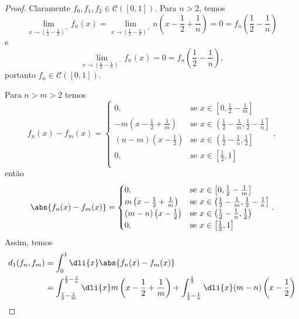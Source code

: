 \begin{proof}
    Claramente \(f_0, f_1, f_2 \in \mathcal{C}([0,1])\). Para \(n > 2\), temos
    \begin{equation*}
        \lim_{x\to \left(\frac12-\frac1n\right)^+} f_n(x) = \lim_{x\to\left(\frac12-\frac1n\right)^+} n\left(x-\frac12+\frac1n\right) = 0 = f_n\left(\frac12-\frac1n\right)
    \end{equation*}
    e
    \begin{equation*}
        \lim_{x\to \left(\frac12-\frac1n\right)^-} f_n(x) = 0 = f_n\left(\frac12-\frac1n\right),
    \end{equation*}
    portanto \(f_n \in \mathcal{C}([0,1])\).

    Para \(n > m > 2\) temos
    \begin{equation*}
        f_n(x) - f_m(x) = \begin{cases}
            0, &\text{se }x \in \left[0, \frac12-\frac1m\right]\\
            -m\left(x - \frac12 + \frac1m\right)&\text{se }x \in \left(\frac12 - \frac1m, \frac12-\frac1n\right]\\
            (n-m)\left(x - \frac12\right)&\text{se }x \in \left(\frac12 - \frac1n, \frac12\right]\\
            0, &\text{se }x \in \left[\frac12, 1\right]\\
        \end{cases},
    \end{equation*}
    então
    \begin{equation*}
        \abs{f_n(x) - f_m(x)} = \begin{cases}
            0, &\text{se }x \in \left[0, \frac12-\frac1m\right]\\
            m\left(x - \frac12 + \frac1m\right)&\text{se }x \in \left(\frac12 - \frac1m, \frac12-\frac1n\right]\\
            (m-n)\left(x - \frac12\right)&\text{se }x \in \left(\frac12 - \frac1n, \frac12\right)\\
            0, &\text{se }x \in \left[\frac12, 1\right]\\
        \end{cases}.
    \end{equation*}
    Assim, temos
    \begin{align*}
        d_1(f_n, f_m) &= \int_0^1\dli{x} \abs{f_n(x) - f_m(x)} \\
                      &= \int_{\frac12-\frac1m}^{\frac12 - \frac1n}\dli{x} m\left(x - \frac12 + \frac1m\right) + \int_{\frac12-\frac1n}^{\frac12} \dli{x} (m-n)\left(x - \frac12\right)\\

\end{align*}
\end{proof}

